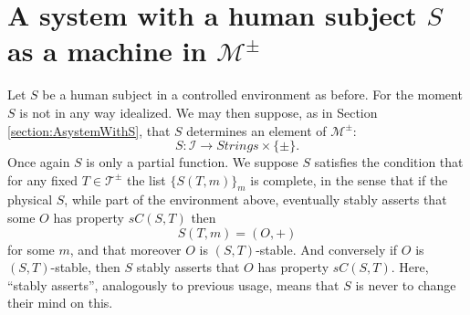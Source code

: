 \documentclass{amsart}  %
\numberwithin{equation}{section}
\theoremstyle{definition}
\theoremstyle{remark}
\begin{document}
{\section{A system with a human subject $S$ as a machine in $\mathcal{M} ^{\pm}$} \label{section:systemMpm}
Let $S$ be a human subject in a controlled environment as before. For the moment $S$ is not in any way idealized. We may then suppose,  as in Section  \ref{section:AsystemWithS}, that $S$ determines an element of $ \mathcal{M} ^{\pm} $: 
\begin{equation} \label{eq:Smachine}
{S}: \mathcal{I} \to Strings \times \{\pm\}. 
\end{equation}
Once again $S$ is only a partial function.
We suppose $S$ satisfies the condition that for any fixed ${T} \in \mathcal{T} ^{\pm} $  the list $\{S (T,m)\} _{m} $ is complete, in the sense that if the physical $S$, while part of the environment above, eventually stably asserts that some $O$ has property $sC (S,T)$ then $$  S ({T},m)=(O, +)  $$ for some $m$, and that moreover $O$ is $(S,T)$-stable. 
And conversely if $O$ is $(S,T)$-stable, then $S$ stably asserts that $O$ has property $sC (S,T)$. Here, ``stably asserts'', analogously to previous usage,  means that $S$ is never to change their mind on this. 

}
\end{document}
